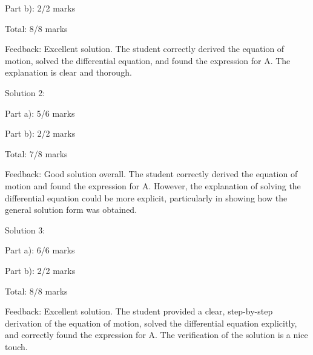 \documentclass[a4paper,11pt]{article}
\begin{document}
Part b): 2/2 marks

Total: 8/8 marks

Feedback: Excellent solution. The student correctly derived the equation of motion, solved the differential equation, and found the expression for A. The explanation is clear and thorough.

Solution 2:

Part a): 5/6 marks

Part b): 2/2 marks

Total: 7/8 marks

Feedback: Good solution overall. The student correctly derived the equation of motion and found the expression for A. However, the explanation of solving the differential equation could be more explicit, particularly in showing how the general solution form was obtained.

Solution 3:

Part a): 6/6 marks

Part b): 2/2 marks

Total: 8/8 marks

Feedback: Excellent solution. The student provided a clear, step-by-step derivation of the equation of motion, solved the differential equation explicitly, and correctly found the expression for A. The verification of the solution is a nice touch.
\end{document}
